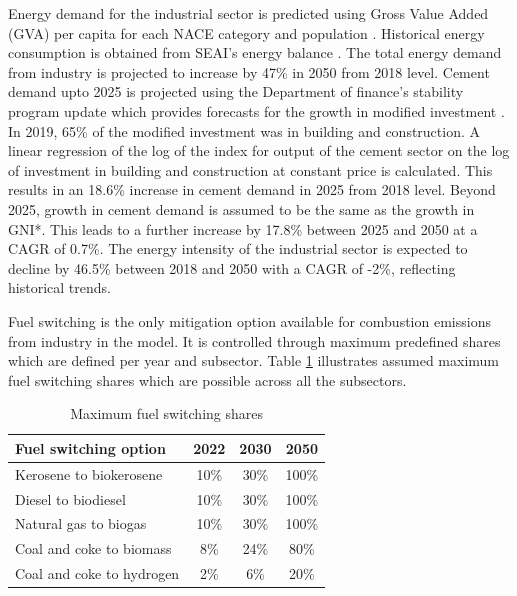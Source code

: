 \documentclass[gmd,manuscript]{copernicus}
\begin{document}
Energy demand for the industrial sector is predicted using Gross Value Added (GVA) per capita for each NACE category and population \citep{Yakut2020}. Historical energy consumption is obtained from SEAI's energy balance \citep{SEAI2019}. The total energy demand from industry is projected to increase by 47\% in 2050 from 2018 level. Cement demand upto 2025 is projected using the Department of finance's stability program update which provides forecasts for the growth in modified investment \cite{April2020}. In 2019, 65\% of the modified investment was in building and construction. A linear regression of the log of the index for output of the cement sector on the log of investment in building and construction at constant price is calculated. This results in an 18.6\% increase in cement demand in 2025 from 2018 level. Beyond 2025, growth in cement demand is assumed to be the same as the growth in GNI*. This leads to a further increase by 17.8\% between 2025 and 2050 at a CAGR of 0.7\%.   The energy intensity of the industrial sector is expected to decline by 46.5\% between 2018 and 2050 with a CAGR of -2\%, reflecting historical trends. 

Fuel switching is the only mitigation option available for combustion emissions from industry in the model. It is controlled through maximum predefined shares which are defined per year and subsector. Table \ref{Maximum fuel switching share in Industry} illustrates assumed maximum fuel switching shares which are possible across all the subsectors. 

\begin{table}[htbp]
\footnotesize
 \centering
 \caption{Maximum fuel switching shares}
 \begin{tabular}{lccc}
 \hline
 Fuel switching option & 2022 & 2030 & 2050 \\
 \hline
 Kerosene to biokerosene & 10\% & 30\% & 100\% \\
 Diesel to biodiesel & 10\% & 30\% & 100\% \\
 Natural gas to biogas & 10\% & 30\% & 100\% \\ 
 Coal and coke to biomass & 8\% & 24\% & 80\% \\ 
 Coal and coke to hydrogen & 2\% & 6\% & 20\% \\ \hline
 \end{tabular}%
 \label{Maximum fuel switching share in Industry}%
\end{table}%
\end{document}
